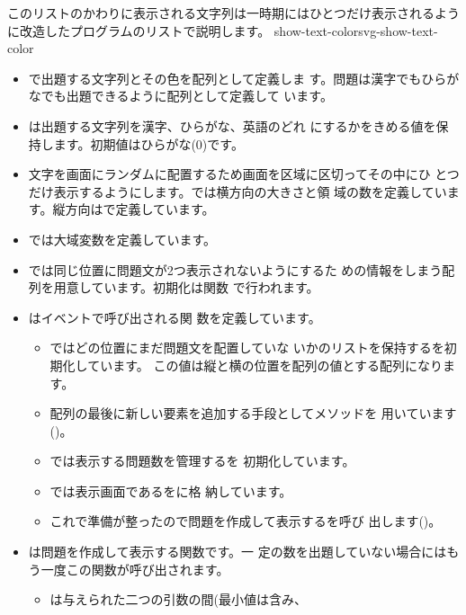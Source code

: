 このリストのかわりに表示される文字列は一時期にはひとつだけ表示されるよう
に改造したプログラムのリストで説明します。
\newpage
{}
    {show-text-color}{svg-show-text-color}
\begin{itemize}
 \item {}で出題する文字列とその色を配列として定義しま
       す。問題は漢字でもひらがなでも出題できるように配列として定義して
       います。
 \item {}は出題する文字列を漢字、ひらがな、英語のどれ
       にするかをきめる値を保持します。初期値はひらがな($0$)です。
 \item 文字を画面にランダムに配置するため画面を区域に区切ってその中にひ
       とつだけ表示するようにします。では横方向の大きさと領
       域の数を定義しています。縦方向はで定義しています。
 \item {}では大域変数を定義しています。
 \item {}では同じ位置に問題文が2つ表示されないようにするた
       めの情報をしまう配列を用意しています。初期化は関数
       で行われます。
 \item {}はイベントで呼び出される関
       数を定義しています。
\begin{itemize}
 \item {}ではどの位置にまだ問題文を配置していな
       いかのリストを保持するを初期化しています。
       この値は縦と横の位置を配列の値とする配列になります。
 \item 配列の最後に新しい要素を追加する手段としてメソッドを
       用いています()。
 \item {}では表示する問題数を管理するを
       初期化しています。
 \item {}では表示画面であるをに格
       納しています。
 \item これで準備が整ったので問題を作成して表示するを呼び
       出します()。
\end{itemize}
 \item {}は問題を作成して表示する関数です。一
       定の数を出題していない場合にはもう一度この関数が呼び出されます。
\begin{itemize}
 \item {}は与えられた二つの引数の間(最小値は含み、

\end{itemize}
\end{itemize}
